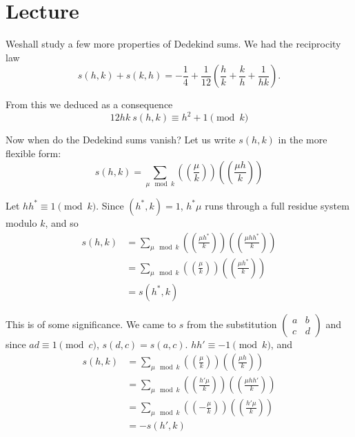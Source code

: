 \chapter{Lecture}\label{part3:lec32} %

We\pageoriginale shall study a few more properties of Dedekind
sums. We had the reciprocity law
$$
s(h, k)+ s(k, h)=- \frac{1}{4} + \frac{1}{12} \left( \frac{h}{k} +
\frac{k}{h} + \frac{1}{hk}\right).
$$

From this we deduced as a consequence
\begin{equation*}
  12 hk ~s(h, k) \equiv h^2+1 \pmod{k} \tag{*}\label{part3:lec32:eq*}
\end{equation*}

Now when do the Dedekind sums vanish? Let us write $s(h, k)$ in the
more flexible form:
$$
s(h, k)= \sum_{\mu \mod k} \left(\left( \frac{\mu}{k}\right)\right)
\left(\left( \frac{\mu h}{k}\right) \right)
$$

Let $h h^* \equiv 1 \pmod{k}$. Since $(h^*, k)=1$, $h^* \mu$ runs
through a full residue system modulo $k$, and so
\begin{align*}
  s(h, k) & = \sum_{\mu \mod k} \left(\left( \frac{\mu
    h^*}{k}\right)\right)\left(\left( \frac{\mu
    hh^*}{k}\right)\right)\\
  & = \sum_{\mu \mod k} \left(\left( \frac{\mu}{k}\right)\right)
  \left(\left( \frac{\mu h^*}{k}\right)\right)\\
  & = s(h^*, k)
\end{align*}

This is of some significance. We came to $s$ from the substitution
$\left(\begin{smallmatrix} a & b\\ c & d\end{smallmatrix}\right)$ and since
  $ad\equiv 1 \pmod{c}$, $s(d, c)= s(a, c)$. $hh' \equiv -1 \pmod{k}$,
  and 
\begin{align*}
  s(h, k)& = \sum_{\mu \mod k} \left(\left(
  \frac{\mu}{k}\right)\right) \left(\left( \frac{\mu
    h}{k}\right)\right) \\
  & = \sum_{\mu \mod k} \left(\left( \frac{h'\mu}{k}\right)\right)
  \left(\left( \frac{\mu hh'}{k}\right)\right) \\
  & = \sum_{\mu \mod k} \left(\left( -\frac{\mu}{k}\right)\right)
  \left(\left( \frac{h'\mu}{k}\right)\right)\\
  & = -s (h', k)
\end{align*}

